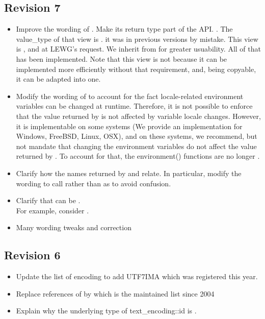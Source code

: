\documentclass{wg21}
\begin{document}
\subsection*{Revision 7}
\begin{itemize}
    \item Improve the wording of . Make its return type part of the API. . The value_type of that view is . it was  in previous versions by mistake. This view is , and  at LEWG's request. We inherit from  for greater usuability. All of that has been implemented.
    Note that this view is not  because it can be implemented more efficiently without that requirement, and, being copyable, it can be adapted into one.
    \item Modify the wording of  to account for the fact locale-related environment variables can be changed at runtime. Therefore, it is not possible to enforce that the value returned by  is not affected by variable locale changes.
    However, it is implementable on some systems (We provide an implementation for Windows, FreeBSD, Linux, OSX), and on these systems, we recommend, but not mandate that changing the environment variables do not affect the value returned by . To account for that, the environment() functions are no longer .
    \item Clarify how the names returned by  and  relate. In particular, modify the wording to call          rather than  as to avoid confusion.
    \item Clarify that  can be .\\
    For example, consider .
    \item Many wording tweaks and correction
\end{itemize}

\subsection*{Revision 6}
\begin{itemize}
    \item Update the list of encoding to add UTF7IMA which was registered this year.
    \item Replace references of \cite{rfc3808} by \cite{ianacharset-mib} which is the maintained list since 2004
    \item Explain why the underlying type of text_encoding::id is .
\end{itemize}
\end{document}
